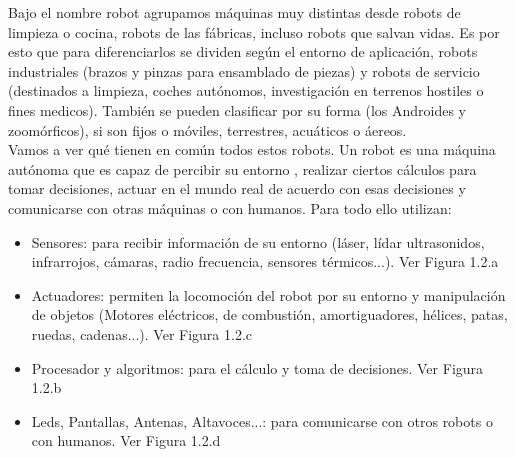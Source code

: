 Bajo el nombre robot agrupamos máquinas muy distintas desde robots de limpieza o cocina, robots de las fábricas, incluso robots que salvan vidas. Es por esto que para diferenciarlos se dividen según el entorno de aplicación, robots industriales (brazos y pinzas para ensamblado de piezas) y robots de servicio (destinados a limpieza, coches autónomos, investigación en terrenos hostiles o fines medicos). También se pueden clasificar por su forma (los Androides y zoomórficos), si son fijos o móviles, terrestres, acuáticos o áereos. \\Vamos a ver qué tienen en común todos estos robots.
Un robot es una máquina autónoma que es capaz de percibir su entorno , realizar ciertos cálculos para tomar decisiones, actuar en el mundo real de acuerdo con esas decisiones y comunicarse con otras máquinas o con humanos.
Para todo ello utilizan:


\begin{itemize}
  \item Sensores: para recibir información de su entorno (láser, lídar ultrasonidos, infrarrojos, cámaras, radio frecuencia, sensores térmicos...). Ver Figura 1.2.a
  \item Actuadores:  permiten la locomoción del robot por su entorno y manipulación de objetos (Motores eléctricos, de combustión, amortiguadores, hélices, patas, ruedas, cadenas...). Ver Figura 1.2.c
  \item Procesador y algoritmos: para el cálculo y toma de decisiones. Ver Figura 1.2.b
  \item Leds, Pantallas, Antenas, Altavoces...: para comunicarse con otros robots o con humanos. Ver Figura 1.2.d
\end{itemize}

